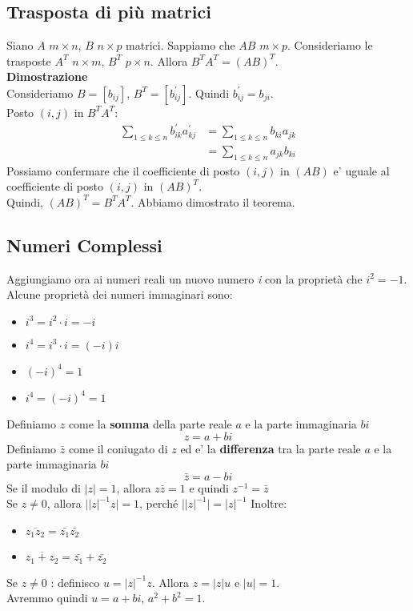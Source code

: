 \documentclass[a4paper, 10pt]{article}
\begin{document}
	\subsection{Trasposta di più matrici}
	Siano $A$ $m \times n$, $B$ $n \times p$ matrici. Sappiamo che $AB$ $m \times p$. 
	Consideriamo le trasposte $A^T$ $n \times m$, $B^T$ $p \times n$. Allora $B^T A^T = (AB)^T$.\\
	\textbf{Dimostrazione}\\
	Consideriamo $B = [b_{ij}]$, $B^T = [b^{'}_{ij}]$. Quindi $b^{'}_{ij} = b_{ji}$. \\
	Posto $(i,j)$ in $B^T A^T$:
	\begin{equation*}
		\begin{split}
			\sum_{1 \leq k \leq n} b^{'}_{ik} a^{'}_{kj} &= \sum_{1 \leq k \leq n} b_{ki} a_{jk} \\
			&= \sum_{1 \leq k \leq n} a_{jk} b_{ki} 
		\end{split}
	\end{equation*}
	Possiamo confermare che il coefficiente di posto $(i,j)$ in $(AB)$ e' uguale al coefficiente di posto $(i,j)$ in $(AB)^T$. \\
	Quindi, $(AB)^T = B^T A^T$. Abbiamo dimostrato il teorema.

	\subsection{Numeri Complessi}
	Aggiungiamo ora ai numeri reali un nuovo numero \textit{i} con la proprietà che $i^{2} = -1$.\\
	Alcune proprietà dei numeri immaginari sono:
	\begin{itemize}
		\item $i^3 = i^2 \cdot i = -i$
		\item $i^4 = i^3 \cdot i = (-i)i$
		\item $(-i)^4 = 1$
		\item $i^4 = (-i)^4 = 1$
	\end{itemize}
	Definiamo $z$ come la \textbf{somma} della parte reale $a$ e la parte immaginaria $bi$ 
	\[
		z = a + bi
	\]
	Definiamo $\bar{z}$ come il coniugato di $z$ ed e' la \textbf{differenza} tra la parte 
	reale $a$ e la parte immaginaria $bi$ 
	\[
		\bar{z} = a - bi
	\]
	Se il modulo di $\vert z \vert = 1$, allora $z \bar{z} = 1$ e quindi $z^{-1} = \bar{z}$ \\
	Se $z \neq 0$, allora $\vert \vert z \vert ^{-1} z \vert = 1$, perché $\vert \vert z \vert ^{-1}
	\vert = \vert z \vert ^{-1}$
	Inoltre:
	\begin{itemize}
		\item $\overline{z_{1}z_{2}} = \bar{z_{1}} \bar{z_{2}}$
		\item $\overline{z_{1}+z_{2}} = \bar{z_{1}} + \bar{z_{2}}$
	\end{itemize}
	Se $z \neq 0$ : definisco $u = \vert z \vert ^{-1} z$.  Allora  $z = \vert z \vert u$ e $\vert u \vert = 1$. \\
	Avremmo quindi $u = a + bi$, $a^2 + b^2 = 1$.
	
\end{document}
